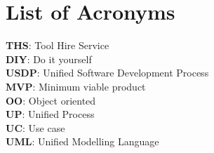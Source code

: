 \documentclass[fontsize=11pt]{extarticle}
\numberwithin{figure}{section} %
\numberwithin{table}{section}%
\begin{document}

\tableofcontents
%
%
\newpage

\listoftables
{}
\listoffigures

\newpage

\section*{List of Acronyms}\label{acronyms}
\textbf{THS}: Tool Hire Service \\
\textbf{DIY}: Do it yourself \\
\textbf{USDP}: Unified Software Development Process  \\
\textbf{MVP}: Minimum viable product \\
\textbf{OO}: Object oriented \\
\textbf{UP}: Unified Process \\
\textbf{UC}: Use case \\
\textbf{UML}: Unified Modelling Language\\



\newpage

\clearpage
{}
\end{document}

